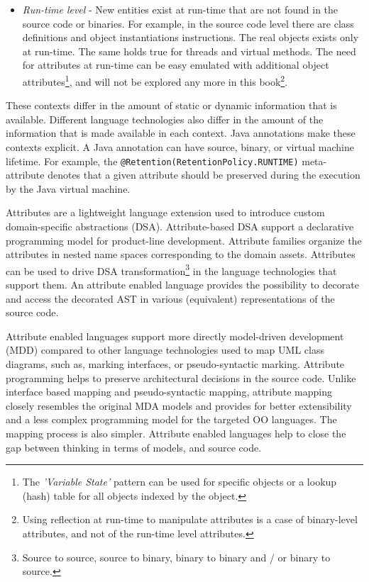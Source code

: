 \begin{itemize}
\item \textit{Run-time level} - New entities exist at run-time that are not found in the source code or binaries. For example, in the source code level there are class definitions and object instantiations instructions. The real objects exists only at run-time. The same holds true for threads and virtual methods.
%
The need for attributes at run-time can be easy emulated with additional object attributes\footnote{The \textit{'Variable State'} pattern \cite{gamma.eclipse.04} can be used for specific objects or a lookup (hash) table for all objects indexed by the object.}, and will not be explored any more in this book\footnote{Using reflection at run-time to manipulate attributes is a case of binary-level attributes, and not of the run-time level attributes.}.
\end{itemize}

These contexts differ in the amount of static or dynamic information that is available. Different language technologies also differ in the amount of the information that is made available in each context. Java annotations \cite{www.java.meta} make these contexts explicit. A Java annotation can have source, binary, or virtual machine lifetime. For example, the \texttt{@Re\-ten\-tion(\-Re\-ten\-tion\-Po\-li\-cy.\-RUN\-TI\-ME)} meta-attribute denotes that a given attribute should be preserved during the execution by the Java virtual machine.




\label{ch03sum}

Attributes are a lightweight language extension used to introduce custom domain-specific abstractions (DSA). Attribute-based DSA support a declarative programming model for product-line development. Attribute families organize the attributes in nested name spaces corresponding to the domain assets. Attributes can be used to drive DSA transformation\footnote{Source to source, source to binary, binary to binary and / or binary to source.} in the language technologies that support them. An attribute enabled language provides the possibility to decorate and access the decorated AST in various (equivalent) representations of the source code.

Attribute enabled languages support more directly model-driven development (MDD) compared to other language technologies used to map UML class diagrams, such as, marking interfaces, or pseudo-syntactic marking. Attribute programming helps to preserve architectural decisions in the source code. Unlike interface based mapping and pseudo-syntactic mapping, attribute mapping closely resembles the original MDA models and provides for better extensibility and a less complex programming model for the targeted OO languages. The mapping process is also simpler. Attribute enabled languages help to close the gap between thinking in terms of models, and source code.

